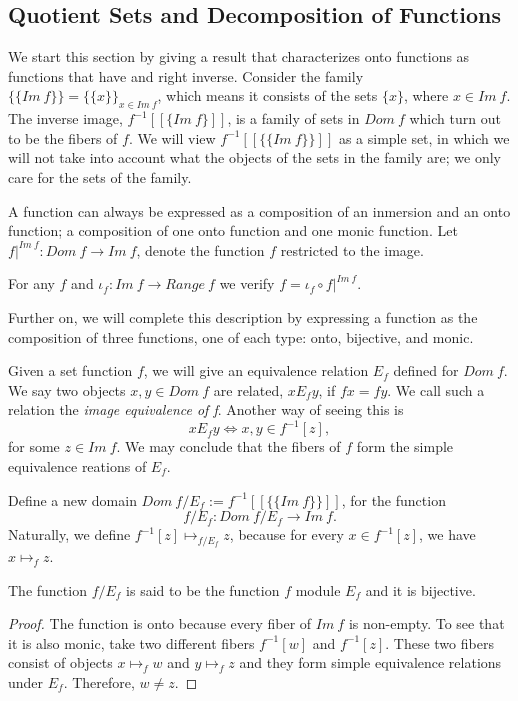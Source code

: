 \documentclass [12pt]{book}
\begin{document}
	\subsection{Quotient Sets and Decomposition of Functions}

We start this section by giving a result that characterizes onto functions as functions that have and right inverse. Consider the family $\{\{Im~f\}\}=\{\{x\}\}_{x\in Im~f}$, which means it consists of the sets $\{x\}$, where $x\in Im~f$. The inverse image, $f^{-1}[[\{Im~f\}]]$, is a family of sets in $Dom~f$ which turn out to be the fibers of $f$. We will view $f^{-1}[[\{\{Im~f\}\}]]$ as a simple set, in which we will not take into account what the objects of the sets in the family are; we only care for the sets of the family.

A function can always be expressed as a composition of an inmersion and an onto function; a composition of one onto function and one monic function. Let $f|^{Im~f}:Dom~f\rightarrow Im~f$, denote the function $f$ restricted to the image.

\begin{lemma2.1}For any $f$ and $\iota_f:Im~f\rightarrow Range~f$ we verify $f=\iota_f\circ f|^{Im~f}$.\end{lemma2.1}

Further on, we will complete this description by expressing a function as the composition of three functions, one of each type: onto, bijective, and monic.

Given a set function $f$, we will give an equivalence relation $E_f$ defined for $Dom~f$. We say two objects $x,y\in Dom~f$ are related, $xE_fy$, if $fx=fy$. We call such a relation the \textit{image equivalence of f}. Another way of seeing this is $$xE_fy\Longleftrightarrow x,y\in f^{-1}[z],$$for some $z\in Im~f$. We may conclude that the fibers of $f$ form the simple equivalence reations of $E_{f}$.

Define a new domain $Dom~f/E_f:=f^{-1}[[\{\{Im~f\}\}]]$, for the function $$f/E_f:Dom~f/E_f\rightarrow Im~f.$$ Naturally, we define $f^{-1}[z]\mapsto_{f/E_f}z$, because for every $x\in f^{-1}[z]$, we have $x\mapsto_fz$.

\begin{lemma2.2}The function $f/E_f$ is said to be the function $f$ module $E_{f}$ and it is bijective.\end{lemma2.2}

\begin{proof}The function is onto because every fiber of $Im~f$ is non-empty. To see that it is also monic, take two different fibers $f^{-1}[w]$ and $f^{-1}[z]$. These two fibers consist of objects $x\mapsto_f w$ and $y\mapsto_f z$ and they form simple equivalence relations under $E_f$. Therefore, $w\neq z$.\end{proof}
\end{document}
